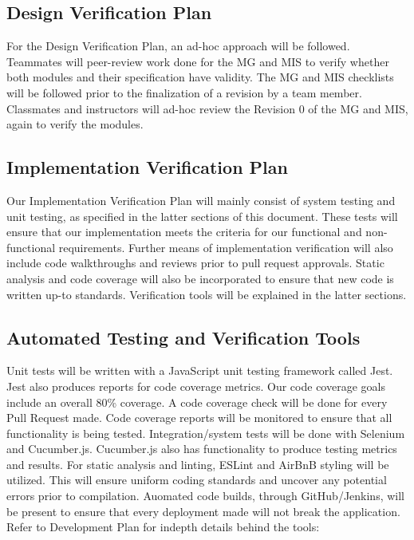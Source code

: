\documentclass[12pt, titlepage]{article}
\begin{document}
\subsection{Design Verification Plan}
For the Design Verification Plan, an ad-hoc approach will be followed. Teammates will peer-review work done for the MG and MIS to verify whether both modules and their specification have validity. The MG and MIS checklists will be followed prior to the finalization of a revision by a team member. Classmates and instructors will ad-hoc review the Revision 0 of the MG and MIS, again to verify the modules.

\subsection{Implementation Verification Plan}
Our Implementation Verification Plan will mainly consist of system testing and unit testing, as specified in the latter sections of this document. These tests will ensure that our implementation meets the criteria for our functional and non-functional requirements.
Further means of implementation verification will also include code walkthroughs and reviews prior to pull request approvals. Static analysis and code coverage will also be incorporated to ensure that new code is written up-to standards. Verification tools will be explained in the latter sections.


\subsection{Automated Testing and Verification Tools}
Unit tests will be written with a JavaScript unit testing framework called Jest. Jest also produces reports for code coverage metrics. Our code coverage goals include an overall 80\% coverage. A code coverage check will be done for every Pull Request made. Code coverage reports will be monitored to ensure that all functionality is being tested. Integration/system tests will be done with Selenium and Cucumber.js. Cucumber.js also has functionality to produce testing metrics and results. For static analysis and linting, ESLint and AirBnB styling will be utilized. This will ensure uniform coding standards and uncover any potential errors prior to compilation. Auomated code builds, through GitHub/Jenkins, will be present to ensure that every deployment made will not break the application. Refer to Development Plan for indepth details behind the tools:

\citet{DevPlan}
\end{document}
